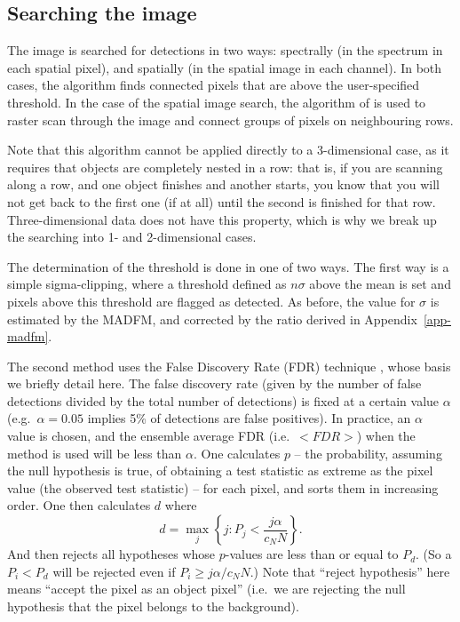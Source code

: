 \documentclass[12pt]{article}
\newcommand{\eg}{e.g.\ }
\newcommand{\ie}{i.e.\ }
\begin{document}
\subsection{Searching the image}
\label{sec-detection}

The image is searched for detections in two ways: spectrally (in the
spectrum in each spatial pixel), and spatially (in the spatial image
in each channel). In both cases, the algorithm finds connected pixels
that are above the user-specified threshold. In the case of the
spatial image search, the algorithm of \citet{lutz80} is used to
raster scan through the image and connect groups of pixels on
neighbouring rows.

Note that this algorithm cannot be applied directly to a 3-dimensional
case, as it requires that objects are completely nested in a row: that
is, if you are scanning along a row, and one object finishes and
another starts, you know that you will not get back to the first one
(if at all) until the second is finished for that
row. Three-dimensional data does not have this property, which is why
we break up the searching into 1- and 2-dimensional cases.

The determination of the threshold is done in one of two ways. The
first way is a simple sigma-clipping, where a threshold defined as
$n\sigma$ above the mean is set and pixels above this threshold are
flagged as detected. As before, the value for $\sigma$ is estimated by
the MADFM, and corrected by the ratio derived in
Appendix~\ref{app-madfm}. 

The second method uses the False Discovery Rate (FDR) technique
\citep{miller01,hopkins02}, whose basis we briefly detail here. The
false discovery rate (given by the number of false detections divided
by the total number of detections) is fixed at a certain value
$\alpha$ (\eg $\alpha=0.05$ implies 5\% of detections are false
positives). In practice, an $\alpha$ value is chosen, and the ensemble
average FDR (\ie $<FDR>$) when the method is used will be less than
$\alpha$.  One calculates $p$ -- the probability, assuming the null
hypothesis is true, of obtaining a test statistic as extreme as the
pixel value (the observed test statistic) -- for each pixel, and sorts
them in increasing order. One then calculates $d$ where
\[
d = \max_j \left\{ j : P_j < \frac{j\alpha}{c_N N} \right\}.
\]
And then rejects all hypotheses whose $p$-values are less than or equal
to $P_d$. (So a $P_i<P_d$ will be rejected even if $P_i \geq
j\alpha/c_N N$.) Note that ``reject hypothesis'' here means ``accept
the pixel as an object pixel'' (\ie we are rejecting the null
hypothesis that the pixel belongs to the background). 
\end{document}
